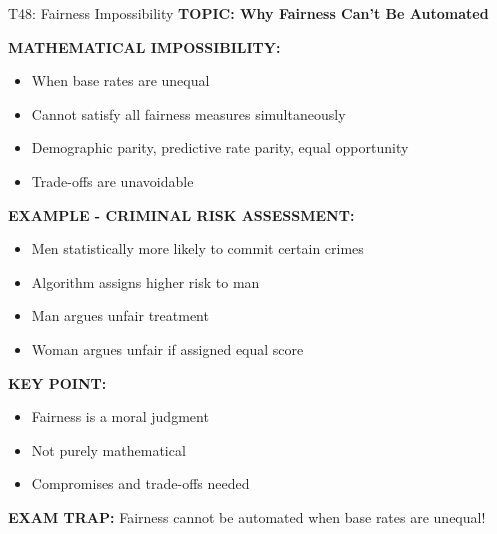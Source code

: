 \documentclass[8pt]{beamer}
\begin{document}
	\begin{frame}{T48: Fairness Impossibility}
		\fontsize{6.5}{7.5}\selectfont
		\textbf{TOPIC: Why Fairness Can't Be Automated}
		
		\vspace{0.1cm}
		\textbf{MATHEMATICAL IMPOSSIBILITY:}
		\begin{itemize}
			\item When base rates are unequal
			\item Cannot satisfy all fairness measures simultaneously
			\item Demographic parity, predictive rate parity, equal opportunity
			\item Trade-offs are unavoidable
		\end{itemize}
		
		\vspace{0.1cm}
		\textbf{EXAMPLE - CRIMINAL RISK ASSESSMENT:}
		\begin{itemize}
			\item Men statistically more likely to commit certain crimes
			\item Algorithm assigns higher risk to man
			\item Man argues unfair treatment
			\item Woman argues unfair if assigned equal score
		\end{itemize}
		
		\vspace{0.1cm}
		\textbf{KEY POINT:}
		\begin{itemize}
			\item Fairness is a moral judgment
			\item Not purely mathematical
			\item Compromises and trade-offs needed
		\end{itemize}
		
		\textcolor{myred}{\textbf{EXAM TRAP:}} Fairness cannot be automated when \textcolor{myblue}{base rates are unequal}!
	\end{frame}
	
\end{document}
